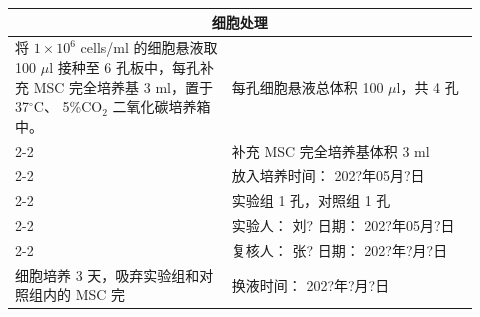 \documentclass[UTF8,10pt,a4paper,fontset=fandol]{ctexart}
\newcommand{\fieldvalue}[1]{#1}
\newcommand{\handwritten}[1]{#1}
\begin{document}
\begin{tabular}{|p{0.43\linewidth}|p{0.49\linewidth}|}
\hline
\multicolumn{2}{c|}{细胞处理}\\
\hline
将 $1\times10^{6}$ cells/ml 的细胞悬液取
100 $\mu$l 接种至 6 孔板中，每孔补充
MSC 完全培养基 3 ml，置于 37$^\circ$C、
5\%CO$_2$ 二氧化碳培养箱中。 &
每孔细胞悬液总体积
\fieldvalue{\handwritten{100}} $\mu$l，共
\fieldvalue{\handwritten{4}} 孔\\
\cline{2-2}
& 补充 MSC 完全培养基体积
\fieldvalue{3} ml\\
\cline{2-2}
& 放入培养时间：
\fieldvalue{\handwritten{202?年05月?日}}\\
\cline{2-2}
& 实验组
\fieldvalue{\handwritten{1}} 孔，对照组
\fieldvalue{\handwritten{1}} 孔\\
\cline{2-2}
& 实验人：
\fieldvalue{\handwritten{刘?}} \quad 日期：
\fieldvalue{\handwritten{202?年05月?日}}\\
\cline{2-2}
& 复核人：
\fieldvalue{\handwritten{张?}} \quad 日期：
\fieldvalue{\handwritten{202?年?月?日}}\\
\hline
细胞培养 3 天，吸弃实验组和对照组内的 MSC 完 &
换液时间：
\fieldvalue{\handwritten{202?年?月?日}}\\
\hline
\end{tabular}

\end{document}
